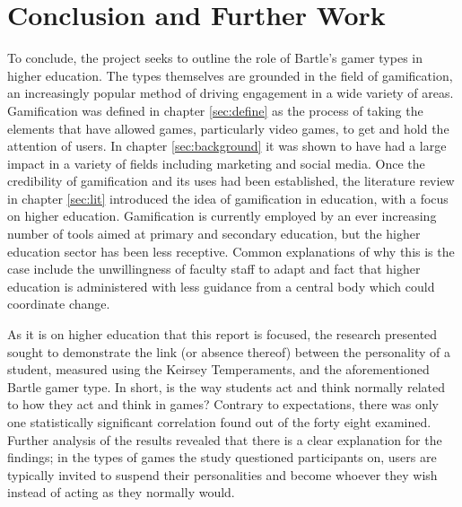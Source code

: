 \documentclass[12pt,a4paper,twoside]{report}
\begin{document}
\chapter{Conclusion and Further Work}
\label{sec:conclusion}
To conclude, the project seeks to outline the role of Bartle's gamer types in higher education. The types themselves are grounded in the field of gamification, an increasingly popular method of driving engagement in a wide variety of areas. Gamification was defined in chapter \ref{sec:define} as the process of taking the elements that have allowed games, particularly video games, to get and hold the attention of users. In chapter \ref{sec:background} it was shown to have had a large impact in a variety of fields including marketing and social media. Once the credibility of gamification and its uses had been established, the literature review in chapter \ref{sec:lit} introduced the idea of gamification in education, with a focus on higher education. Gamification is currently employed by an ever increasing number of tools aimed at primary and secondary education, but the higher education sector has been less receptive. Common explanations of why this is the case include the unwillingness of faculty staff to adapt and fact that higher education is administered with less guidance from a central body which could coordinate change.

As it is on higher education that this report is focused, the research presented sought to demonstrate the link (or absence thereof) between the personality of a student, measured using the Keirsey Temperaments, and the aforementioned Bartle gamer type. In short, is the way students act and think normally related to how they act and think in games? Contrary to expectations, there was only one statistically significant correlation found out of the forty eight examined. Further analysis of the results revealed that there is a clear explanation for the findings; in the types of games the study questioned participants on, users are typically invited to suspend their personalities and become whoever they wish instead of acting as they normally would.
\end{document}
